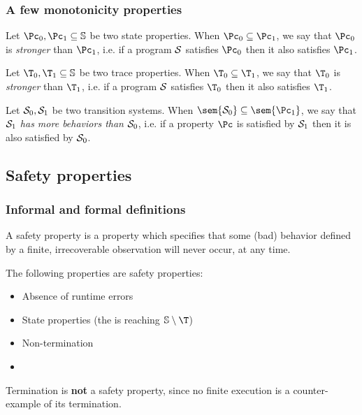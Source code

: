 \documentclass[toc]{../cs-classes/cs-classes}
\begin{document}
\subsubsection{A few monotonicity properties}
\begin{property}
    Let $\Pc_0, \Pc_1 \subseteq \S$ be two state properties. When $\Pc_0\subseteq\Pc_1$, we say that $\Pc_0$ is \emph{stronger} than $\Pc_1$, i.e. if a program $\mathcal{S}$ satisfies $\Pc_0$ then it also satisfies $\Pc_1$.
\end{property}

\begin{property}
    Let $\T_0, \T_1 \subseteq \S$ be two trace properties. When $\T_0\subseteq\T_1$, we say that $\T_0$ is \emph{stronger} than $\T_1$, i.e. if a program $\mathcal{S}$ satisfies $\T_0$ then it also satisfies $\T_1$.
\end{property}

\begin{property}
    Let $\mathcal{S}_0, \mathcal{S}_1$ be two transition systems. When $\sem{\Sc_0}\subseteq\sem{\Pc_1}$, we say that $\mathcal{S}_1$ \emph{has more behaviors than} $\mathcal{S}_0$, i.e. if a property $\Pc$ is satisfied by $\mathcal{S}_1$ then it is also satisfied by $\mathcal{S}_0$.
\end{property}

\subsection{Safety properties}
\subsubsection{Informal and formal definitions}
\begin{definition}
    A safety property is a property which specifies that some (bad) behavior defined by a finite, irrecoverable observation will never occur, at any time.
\end{definition}
\begin{example}
    The following properties are safety properties:
    \begin{itemize}
        \item Absence of runtime errors
        \item State properties (the  is reaching $\S\setminus\T$)
        \item Non-termination 
        \item {}
    \end{itemize}
    Termination is \textbf{not} a safety property, since no finite execution is a counter-example of its termination.
\end{example}
\end{document}
